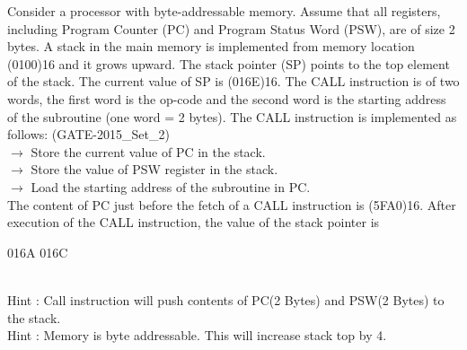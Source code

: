 \begin{questyle}
  \question  Consider a processor with byte-addressable memory. Assume that all registers,
             including Program Counter (PC) and Program Status Word (PSW), are of size 2 bytes. A
             stack in the main memory is implemented from memory location (0100)16 and it grows
             upward. The stack pointer (SP) points to the top element of the stack. The current
             value of SP is (016E)16. The CALL instruction is of two words, the first word is
             the op-code and the second word is the starting address of the subroutine
             (one word = 2 bytes). The CALL instruction is implemented as follows: (GATE-2015\_Set\_2)
             \\ \(\rightarrow\) Store the current value of PC in the stack.
             \\ \(\rightarrow\) Store the value of PSW register in the stack.
             \\ \(\rightarrow\) Load the starting address of the subroutine in PC. \\
             The content of PC just before the fetch of a CALL instruction is (5FA0)16. After
             execution of the CALL instruction, the value of the stack pointer is

  \begin{oneparchoices}
    \choice         016A
    \choice         016C
  \end{oneparchoices}
  \\ Hint : Call instruction will push contents of PC(2 Bytes) and PSW(2 Bytes) to the stack.
  \\ Hint : Memory is byte addressable. This will increase stack top by 4.

\end{questyle}

